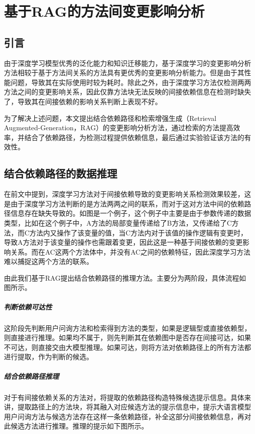 \chapter{基于RAG的方法间变更影响分析}

\section{引言}

由于深度学习模型优秀的泛化能力和知识迁移能力，基于深度学习的变更影响分析方法相较于基于方法间关系的方法具有更优秀的变更影响分析能力。但是由于其性能问题，导致其在实际使用时较为耗时。除此之外，由于深度学习方法仅检测两两方法之间的变更影响关系，因此仅靠方法块无法反映的间接依赖信息在检测时缺失了，导致其在间接依赖的影响关系判断上表现不好。

为了解决上述问题，本文提出结合依赖路径和检索增强生成（Retrieval Augmented-Generation，RAG）的变更影响分析方法，通过检索的方法提高效率，并结合了依赖路径，为检测过程提供依赖信息，最后通过实验验证该方法的有效性。

\section{结合依赖路径的数据推理}

在前文中提到，深度学习方法对于间接依赖导致的变更影响关系检测效果较差，这是由于深度学习方法判断的是方法两两之间的联系，而对于这对方法中间的依赖路径信息存在缺失导致的。如图是一个例子，这个例子中主要是由于参数传递的数据类型，比如在这个例子中，A方法的局部变量传递给了B方法，又传递给了C方法，而C方法内又操作了该变量的值，当C方法内对于该值的操作逻辑有变更时，导致A方法对于该变量的操作也需跟着变更，因此这是一种基于间接依赖的变更影响关系。而在AC这两个方法体中，并没有AC之间的依赖特征，因此深度学习方法难以捕捉这两个方法的联系。



由此我们基于RAG提出结合依赖路径的推理方法。主要分为两阶段，具体流程如图所示。

\paragraph{判断依赖可达性} 这阶段先判断用户问询方法和检索得到方法的类型，如果是逻辑型或直接依赖型，则直接进行推理。如果均不属于，则先判断其在依赖图中是否存在间接可达，如果不可达，则直接交由大模型推理。如果可达，则将方法对依赖路径上的所有方法都进行提取，作为判断的候选。

\paragraph{结合依赖路径推理} 对于有间接依赖关系的方法对，将提取的依赖路径构造特殊候选提示信息。具体来讲，提取路径上的方法块，将其融入对应候选方法的提示信息中，提示大语言模型用户问询方法与候选方法存在这样一条依赖路径，补全这部分间接依赖信息，再对此候选方法进行推理。推理的提示如下图所示。

